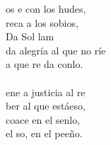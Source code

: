 \begin{cancion}%
	os e con los hudes, \\
	reca a los sobios,\\
Da     Sol           lam\\
da alegría al que no ríe\\
	a que re da conlo.\\
	\jump\\
	ene a  justicia al re\\
	ber al que estáeso,\\
	 coace en el senlo,\\
	 el so, en el peeño.\\
\end{cancion}%
